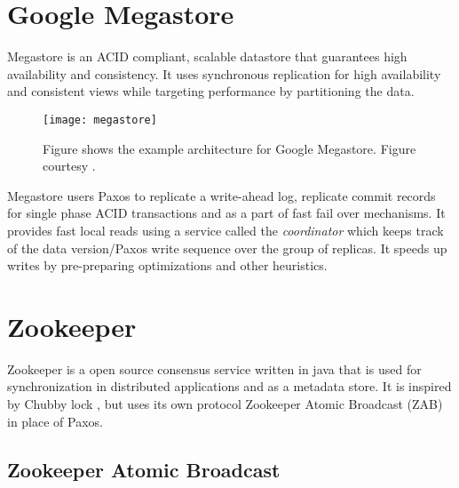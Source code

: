 \section{Google Megastore}

Megastore \citep{BakerBCFKLLLLY11} is an ACID%
compliant, scalable datastore that guarantees high availability and
consistency. It uses synchronous replication for high availability and
consistent views while targeting performance by partitioning the data.

\begin{figure}
  \texttt{[image: megastore]}
  \caption[Google Megastore]{%
    Figure shows the example architecture for Google Megastore.
    Figure courtesy \citet{BakerBCFKLLLLY11}.}
  \label{figure:megastore}
\end{figure}

Megastore users Paxos to replicate a write-ahead log, replicate commit
records for single phase ACID transactions and as a part of fast fail over
mechanisms. It provides fast local reads using a service called the
\emph{coordinator} which keeps track of the data version/Paxos write
sequence over the group of replicas. It speeds up writes by pre-preparing
optimizations and other heuristics.

\section{Zookeeper}
\label{section:zookeeper}

Zookeeper \citep{Hunt:2010:ZWC:1855840.1855851, zookeeper} is a open source 
consensus service written in java that is used for synchronization in 
distributed applications and as a metadata store. It is inspired by Chubby lock 
, but uses its own protocol Zookeeper Atomic Broadcast 
(ZAB) in place of Paxos.

\subsection{Zookeeper Atomic Broadcast}

